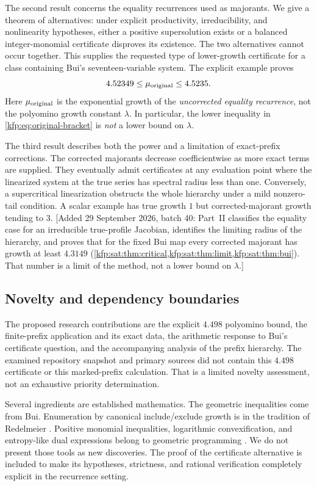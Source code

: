 \documentclass[11pt,a4paper]{article}
\theoremstyle{definition}
\theoremstyle{remark}
\begin{document}
The second result concerns the equality recurrences used as majorants.
We give a theorem of alternatives: under explicit productivity,
irreducibility, and nonlinearity hypotheses, either a positive
supersolution exists or a balanced integer-monomial certificate disproves its
existence. The two alternatives cannot occur together. This supplies the
requested type of lower-growth certificate for a class containing Bui's
seventeen-variable system. The explicit example proves
\begin{equation}\label{kfp:eq:original-bracket}
 4.52349\leq\mu_{\rm original}\leq4.5235.
\end{equation}
Here $\mu_{\rm original}$ is the exponential growth of the \emph{uncorrected
equality recurrence}, not the polyomino growth constant $\lambda$.
In particular, the lower inequality in \eqref{kfp:eq:original-bracket} is
\emph{not} a lower bound on $\lambda$.

The third result describes both the power and a limitation of exact-prefix
corrections. The corrected majorants decrease coefficientwise as more exact
terms are supplied. They eventually admit certificates at any evaluation
point where the linearized system at the true series has spectral radius
less than one. Conversely, a supercritical linearization obstructs the
whole hierarchy under a mild nonzero-tail condition. A scalar example has
true growth $1$ but corrected-majorant growth tending to $3$.
[Added 29 September 2026, batch 40: Part~II classifies the equality case
for an irreducible true-profile Jacobian, identifies the limiting radius of
the hierarchy, and proves that for the fixed Bui map every corrected
majorant has growth at least $4.3149$ (\cref{kfp:sat:thm:critical,kfp:sat:thm:limit,kfp:sat:thm:bui}).
That number is a limit of the method, not a lower bound on $\lambda$.]

\subsection{Novelty and dependency boundaries}
The proposed research contributions are the explicit $4.498$ polyomino bound,
the finite-prefix application and its exact data, the arithmetic response to
Bui's certificate question, and the accompanying analysis of the prefix
hierarchy. The examined repository snapshot and primary sources did not
contain this $4.498$ certificate or this marked-prefix calculation. That is a
limited novelty assessment, not an exhaustive priority determination.

Several ingredients are established mathematics. The geometric inequalities
come from Bui. Enumeration by canonical include/exclude growth is in the
tradition of Redelmeier \cite{redelmeier}. Positive monomial inequalities,
logarithmic convexification, and entropy-like dual expressions belong to
geometric programming \cite{duffin,boyd,bv}. We do not present those tools as
new discoveries. The proof of the certificate alternative is included to
make its hypotheses, strictness, and rational verification completely
explicit in the recurrence setting.
\end{document}

